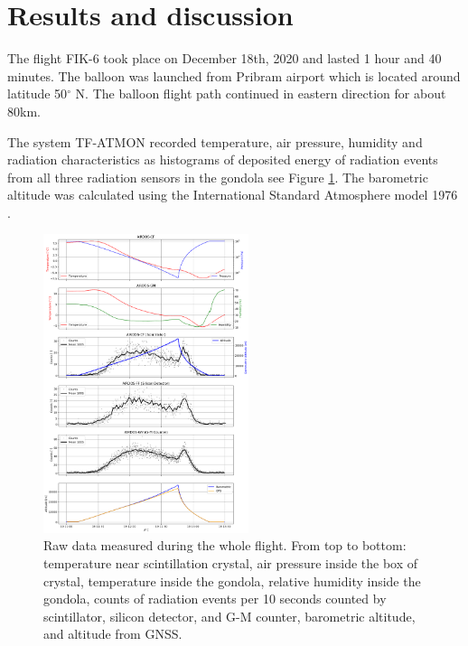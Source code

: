 \documentclass{Rpd}
\begin{document}
\section{Results and discussion}

The flight FIK-6 took place on December 18th, 2020 and lasted 1 hour and 40 minutes. The balloon was launched from Pribram airport which is located around latitude 50$^{\circ}$ N. The balloon flight path continued in eastern direction for about 80km. 

The system TF-ATMON recorded temperature, air pressure, humidity and radiation characteristics as histograms of deposited energy of radiation events from all three radiation sensors in the gondola see Figure \ref{FIK-6_RAW_data}. The barometric altitude was calculated using the International Standard Atmosphere model 1976 \cite{standard_atmosphere}. 


\begin{center}
\begin{figure}%
	\centerline{\includegraphics[width=60mm]{img/FIK-6_RAW_data.png}}
	\caption{Raw data measured during the whole flight. From top to bottom: temperature near scintillation crystal, air pressure inside the box of crystal, temperature inside the gondola, relative humidity inside the gondola, counts of radiation events per 10 seconds counted by scintillator, silicon detector, and  G-M counter, barometric altitude, and altitude from GNSS.\label{FIK-6_RAW_data}}
\end{figure}
\end{center}
\end{document}
